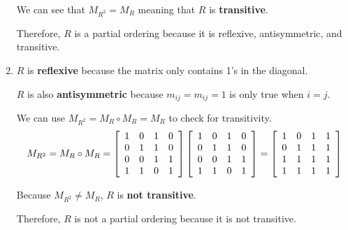\documentclass[letterpaper, 12pt]{article}
\begin{document}
\begin{enumerate}
    We can see that $M_{R^2} = M_R$ meaning that $R$ is \textbf{transitive}.
    
    Therefore, $R$ is a partial ordering because it is reflexive, antisymmetric, and transitive.
    
    \item $R$ is \textbf{reflexive} because the matrix only contains 1's in the diagonal.
    
    $R$ is also \textbf{antisymmetric} because $m_{ij} = m_{ij} = 1$ is only true when $i = j$.
    
    We can use $M_{R^2} = M_R \circ M_R = M_R$ to check for transitivity.
    \[
    M_{R^2} = M_R \circ M_R =
    \left[
    \begin{array}{c c c c}
         1 & 0 & 1 & 0 \\
         0 & 1 & 1 & 0 \\
         0 & 0 & 1 & 1 \\
         1 & 1 & 0 & 1
    \end{array}
    \right]
    \left[
    \begin{array}{c c c c}
         1 & 0 & 1 & 0 \\
         0 & 1 & 1 & 0 \\
         0 & 0 & 1 & 1 \\
         1 & 1 & 0 & 1
    \end{array}
    \right]
    =
    \left[
    \begin{array}{c c c c}
         1 & 0 & 1 & 1 \\
         0 & 1 & 1 & 1 \\
         1 & 1 & 1 & 1 \\
         1 & 1 & 1 & 1
    \end{array}
    \right]
    \]
    
    Because $M_{R^2} \neq M_R$, $R$ is \textbf{not transitive}.
    
    Therefore, $R$ is not a partial ordering because it is not transitive.
\end{enumerate}
\end{document}
